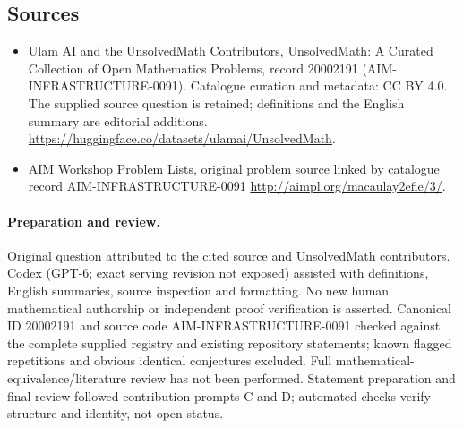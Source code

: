 \documentclass[11pt]{article}
\begin{document}
\subsection{Sources}
\begin{itemize}
\item[\hypertarget{source:20002191:1}{S1}] Ulam AI and the UnsolvedMath Contributors, UnsolvedMath: A Curated Collection of Open Mathematics Problems, record 20002191 (AIM-INFRASTRUCTURE-0091). Catalogue curation and metadata: CC BY 4.0. The supplied source question is retained; definitions and the English summary are editorial additions.
\url{https://huggingface.co/datasets/ulamai/UnsolvedMath}.
\item[\hypertarget{source:20002191:2}{S2}] AIM Workshop Problem Lists, original problem source linked by catalogue record AIM-INFRASTRUCTURE-0091
\url{http://aimpl.org/macaulay2efie/3/}.
\end{itemize}
\paragraph{Preparation and review.}
Original question attributed to the cited source and UnsolvedMath contributors. Codex (GPT-6; exact serving revision not exposed) assisted with definitions, English summaries, source inspection and formatting. No new human mathematical authorship or independent proof verification is asserted. Canonical ID 20002191 and source code AIM-INFRASTRUCTURE-0091 checked against the complete supplied registry and existing repository statements; known flagged repetitions and obvious identical conjectures excluded. Full mathematical-equivalence/literature review has not been performed. Statement preparation and final review followed contribution prompts C and D; automated checks verify structure and identity, not open status.
\label{end:20002191}
\end{document}

